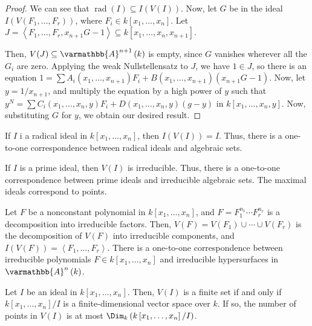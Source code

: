 \documentclass[10pt]{mypackage}
\renewcommand*{\mathbb}[1]{\varmathbb{#1}}
\newcommand{\A}{\mathbb{A}}
\begin{document}
\begin{proof}
  We can see that $\operatorname{rad}\left( I \right)\subseteq I\left(V(I)\right)$. Now, let $G$ be in the ideal $I\left( V\left( F_1,\dots,F_r \right) \right)$, where $F_i\in k\left[ x_1,\dots,x_n \right]$. Let $J = \left\langle F_1,\dots,F_r,x_{n+1}G - 1 \right\rangle\subseteq k\left[ x_1,\dots,x_n,x_{n+1} \right]$.\newline

  Then, $V(J)\subseteq \A^{n+1}\left( k \right)$ is empty, since $G$ vanishes wherever all the $G_i$ are zero. Applying the weak Nullstellensatz to $J$, we have $1\in J$, so there is an equation $1= \sum A_i\left( x_1,\dots,x_{n+1} \right)F_i + B\left( x_1,\dots,x_{n+1} \right)\left( x_{n+1}G - 1 \right)$. Now, let $y = 1/x_{n+1}$, and multiply the equation by a high power of $y$ such that $y^N = \sum C_i\left( x_1,\dots,x_n,y \right)F_i + D\left( x_1,\dots,x_n,y \right)\left( g-y \right)$ in $k\left[ x_1,\dots,x_n,y \right]$. Now, substituting $G$ for $y$, we obtain our desired result.
\end{proof}
\begin{corollary}
  If $I$ i a radical ideal in $k\left[ x_1,\dots,x_n \right]$, then $I(V(I)) = I$. Thus, there is a one-to-one correspondence between radical ideals and algebraic sets.
\end{corollary}
\begin{corollary}
  If $I$ is a prime ideal, then $V(I)$ is irreducible. Thus, there is a one-to-one correspondence between prime ideals and irreducible algebraic sets. The maximal ideals correspond to points.
\end{corollary}
\begin{corollary}
  Let $F$ be a nonconstant polynomial in $k\left[ x_1,\dots,x_n \right]$, and $F = F_1^{n_1}\cdots F_r^{n_r}$ is a decomposition into irreducible factors. Then, $V(F) = V\left(F_1\right)\cup\cdots\cup V\left( F_r \right)$ is the decomposition of $V(F)$ into irreducible components, and $I(V(F)) = \left\langle F_1,\dots,F_r \right\rangle$. There is a one-to-one correspondence between irreducible polynomials $F\in k\left[ x_1,\dots,x_n \right]$ and irreducible hypersurfaces in $\A^n\left( k \right)$.
\end{corollary}
\begin{corollary}
  Let $I$ be an ideal in $k\left[ x_1,\dots,x_n \right]$. Then, $V(I)$ is a finite set if and only if $k\left[ x_1,\dots,x_n \right]/I$ is a finite-dimensional vector space over $k$. If so, the number of points in $V(I)$ is at most $\Dim_{k}\left( k\left[ x_1,\dots,x_n \right]/I \right)$.
\end{corollary}
\end{document}
